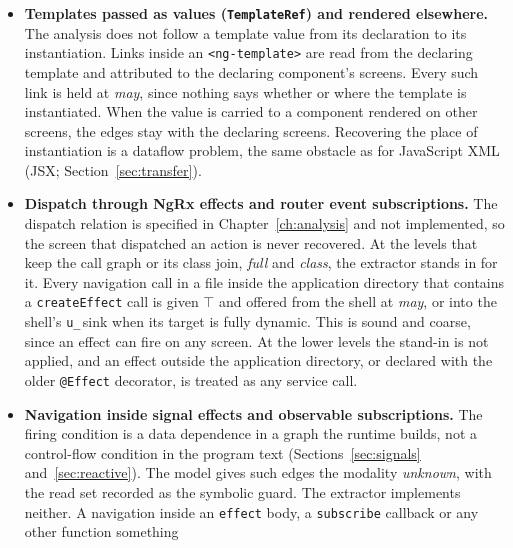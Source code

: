 \begin{itemize}[nosep]
when the screen is the route of the component that holds the site, and only then can the edge be must.
It is held at may where the component is rendered under a route it does not own, where \texttt{relativeTo}
is written in shorthand, passed through a variable or given another route, where a link binds its own
\texttt{[relativeTo]} input, and where the edge leaves a node without a path of its own.
Such an edge can name the wrong screen, which the may tier admits and the must tier does not.
\item \textbf{Templates passed as values (\texttt{TemplateRef}) and rendered elsewhere.} The analysis
does not follow a template value from its declaration to its instantiation. Links inside an
\texttt{<ng-template>} are read from the declaring template and attributed to the declaring component's
screens.
Every such link is held at \emph{may}, since nothing says whether or where the template is
instantiated. When the value is carried to a component rendered on other screens, the edges stay with the
declaring screens. Recovering the place of instantiation is a dataflow problem, the same obstacle as for
JavaScript XML (JSX; Section~\ref{sec:transfer}).
\item \textbf{Dispatch through NgRx effects and router event subscriptions.} The dispatch relation is
specified in Chapter~\ref{ch:analysis} and not implemented, so the screen that dispatched an action is
never recovered. At the levels that keep the call graph or its class join, \emph{full} and \emph{class},
the extractor stands in for it.
Every navigation call in a file inside the application directory that
contains a \texttt{createEffect} call is given $\top$ and offered from the shell at \emph{may}, or into
the shell's \texttt{u\_}\,sink when its target is fully dynamic. This is sound and coarse, since an
effect can fire on any screen. At the lower levels the stand-in is not applied, and an effect outside
the application directory, or declared with the older \texttt{@Effect} decorator, is treated as any
service call.
\item \textbf{Navigation inside signal effects and observable subscriptions.} The firing condition is
a data dependence in a graph the runtime builds, not a control-flow condition in the program text
(Sections~\ref{sec:signals} and~\ref{sec:reactive}). The model gives such edges the modality
\emph{unknown}, with the read set recorded as the symbolic guard.
The extractor implements neither.
A navigation inside an \texttt{effect} body, a \texttt{subscribe} callback or any other function something

\end{itemize}
